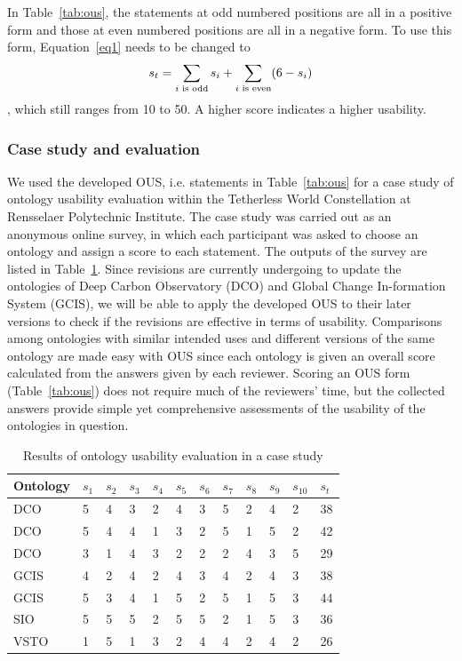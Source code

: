 In Table~\ref{tab:ous}, the statements at odd numbered positions
are all in a positive form and those at even
numbered positions are all in a negative form. To use
this form, Equation~\ref{eq1} needs to be changed to
\begin{equation}
\label{eq2}
s_t = \sum_{i \textrm{ \scriptsize is odd}}s_i+\sum_{i \textrm{ \scriptsize is even}}(6-s_i)
\end{equation}
, which still ranges from 10 to 50. A higher score
indicates a higher usability.
\subsubsection{Case study and evaluation}
\label{sec:prov-pub-eval}
We used the developed OUS, i.e. statements in
Table~\ref{tab:ous} for a case study of ontology usability evaluation
within the Tetherless World Constellation at
Rensselaer Polytechnic Institute. The case study was
carried out as an anonymous online survey, in which
each participant was asked to choose an ontology and
assign a score to each statement. The outputs of the
survey are listed in Table~\ref{tab:ous-case}. Since revisions are currently
undergoing to update the ontologies of Deep Carbon Observatory (DCO) and Global Change In-formation System (GCIS), we will be able to apply the developed OUS to their later versions to check if the revisions are effective in terms of usability. Comparisons among ontologies with similar intended uses and different versions of the same ontology are made easy with OUS since each ontology is given an overall score calculated from the answers given by each reviewer. Scoring an OUS form (Table~\ref{tab:ous}) does not require much of the reviewers' time, but the collected answers provide simple yet comprehensive assessments of the usability of the ontologies in question.
\begin{table}
	\centering
	\caption{Results of ontology usability evaluation in a case study}
	\label{tab:ous-case}
	\begin{tabular}{|l|l|l|l|l|l|l|l|l|l|l|l|}
		\hline Ontology & $s_1$ & $s_2$ & $s_3$ & $s_4$ & $s_5$ & $s_6$ & $s_7$ & $s_8$ & $s_9$ & $s_{10}$ & $s_t$ \\ 
		\hline DCO & 5 & 4 & 3 & 2 & 4 & 3 & 5 & 2 & 4 & 2 & 38 \\ 
		\hline DCO & 5 & 4 & 4 & 1 & 3 & 2 & 5 & 1 & 5 & 2 & 42 \\ 
		\hline DCO & 3 & 1 & 4 & 3 & 2 & 2 & 2 & 4 & 3 & 5 & 29 \\ 
		\hline GCIS & 4 & 2 & 4 & 2 & 4 & 3 & 4 & 2 & 4 & 3 & 38 \\ 
		\hline GCIS & 5 & 3 & 4 & 1 & 5 & 2 & 5 & 1 & 5 & 3 & 44 \\ 
		\hline SIO & 5 & 5 & 5 & 2 & 5 & 5 & 2 & 1 & 5 & 3 & 36 \\ 
		\hline VSTO & 1 & 5 & 1 & 3 & 2 & 4 & 4 & 2 & 4 & 2 & 26 \\ 
		\hline 
	\end{tabular} 
\end{table}

